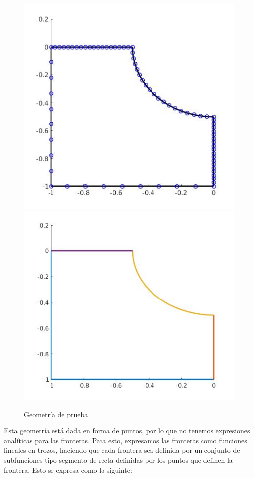 \documentclass[11pt,letterpaper]{article}
\begin{document}
		\begin{figure}[H]
			\centering
			\includegraphics[scale=0.39]{./imgs/img_geometry.jpg}
			\includegraphics[scale=0.39]{./imgs/img_geometry_boundaries.jpg}
			\caption{Geometr\'ia de prueba}
			\label{fig:img_geometry_boundary}
		\end{figure}
		Esta geometr\'ia est\'a dada en forma de puntos, por lo que no tenemos expresiones anal\'iticas para las fronteras.
		Para esto, expresamos las fronteras como funciones lineales en trozos, haciendo que cada frontera sea definida por un conjunto de subfunciones tipo segmento de recta definidas por los puntos que definen la frontera. Esto se expresa como lo siguinte:
\end{document}
